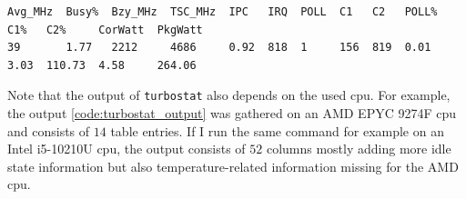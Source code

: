 \begin{listing}
    \begin{verbatim}
Avg_MHz  Busy%  Bzy_MHz  TSC_MHz  IPC   IRQ  POLL  C1   C2   POLL%  C1%   C2%     CorWatt  PkgWatt
39       1.77   2212     4686     0.92  818  1     156  819  0.01   3.03  110.73  4.58     264.06
    \end{verbatim}
    \caption{%
    An example output of the command \texttt{sudo turbostat -n 1 -i 0.001 -S -q} with root privileges enabled for \texttt{turbostat} on an AMD EPYC 9274F \gls{cpu}.
    }
    \label{code:turbostat_output}
\end{listing}
Note that the output of \texttt{turbostat} also depends on the used \gls{cpu}. 
For example, the output \autoref{code:turbostat_output} was gathered on an AMD EPYC 9274F \gls{cpu} and consists of $14$ table entries. 
If I run the same command for example on an Intel i5-10210U \gls{cpu}, the output consists of $52$ columns mostly adding more idle state information but also temperature-related information missing for the AMD \gls{cpu}.
